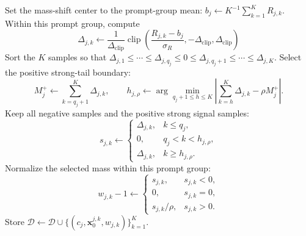 \begin{algorithm}[H]
\begin{algorithmic}[1]
                \State Set the mass-shift center to the prompt-group mean:
                $b_j\leftarrow K^{-1}\sum_{k=1}^{K}R_{j,k}$.
                \State Within this prompt group, compute
                \[
                    \Delta_{j,k}\leftarrow
                    \frac{1}{\Delta_{\mathrm{clip}}}
                    \operatorname{clip}\!\left(
                        \frac{R_{j,k}-b_j}{\sigma_R},
                        -\Delta_{\mathrm{clip}},
                        \Delta_{\mathrm{clip}}
                    \right)
                \]
                \State Sort the $K$ samples so that
                $\Delta_{j,1}\le\cdots\le\Delta_{j,q_j}\le0
                \le\Delta_{j,q_j+1}\le\cdots\le\Delta_{j,K}$.
                \State Select the positive strong-tail boundary:
                \[
                    M_j^+\leftarrow\sum_{k=q_j+1}^{K}\Delta_{j,k},
                    \qquad
                    h_{j,\rho}\leftarrow
                    \arg\min_{q_j+1\le h\le K}
                    \left|\sum_{k=h}^{K}\Delta_{j,k}-\rho M_j^+\right|.
                \]
                \State Keep all negative samples and the positive strong signal samples:
                \[
                    s_{j,k}\leftarrow
                    \begin{cases}
                        \Delta_{j,k},&k\le q_j,\\
                        0,&q_j<k<h_{j,\rho},\\
                        \Delta_{j,k},&k\ge h_{j,\rho}.
                    \end{cases}
                \]
                \State Normalize the selected mass within this prompt group:
                \[
                    w_{j,k}-1\leftarrow
                    \begin{cases}
                        s_{j,k},&s_{j,k}<0,\\
                        0,&s_{j,k}=0,\\
                        s_{j,k}/\rho,&s_{j,k}>0.
                    \end{cases}                    
                \]
                \State Store
                $\mathcal{D}\leftarrow\mathcal{D}\cup
                \{(c_j,\mathbf{x}_0^{j,k},w_{j,k})\}_{k=1}^{K}$.
            \EndFor


\end{algorithmic}
\end{algorithm}
